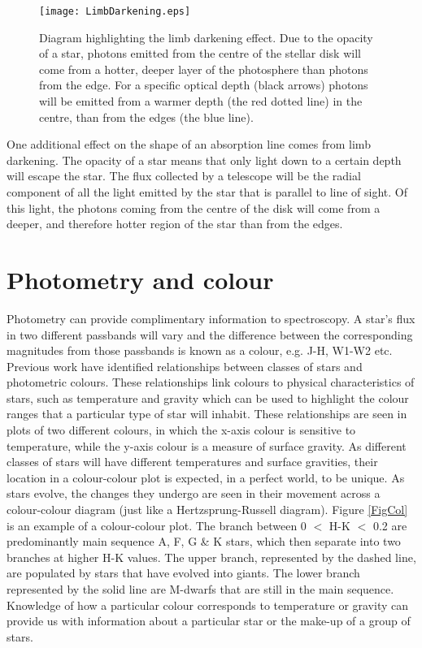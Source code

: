 \begin{figure}[!ht]
\texttt{[image: LimbDarkening.eps]}
\caption{Diagram highlighting the limb darkening effect. Due to the opacity of a star, photons emitted from the centre of the stellar disk will come from a hotter, deeper layer of the photosphere than photons from the edge. For a specific optical depth (black arrows) photons will be emitted from a warmer depth (the red dotted line) in the centre, than from the edges (the blue line).}
\label{FigLimb}
\end{figure}

One additional effect on the shape of an absorption line comes from limb darkening. The opacity of a star means that only light down to a certain depth will escape the star. The flux collected by a telescope will be the radial component of all the light emitted by the star that is parallel to line of sight. Of this light, the photons coming from the centre of the disk will come from a deeper, and therefore hotter region of the star than from the edges.\\

\section{Photometry and colour}
\label{SecPhotCol}
Photometry can provide complimentary information to spectroscopy. A star's flux in two different passbands will vary and the difference between the corresponding magnitudes from those passbands is known as a colour, e.g. J-H, W1-W2 etc. Previous work have identified relationships between classes of stars and photometric colours. These relationships link colours to physical characteristics of stars, such as temperature and gravity which can be used to highlight the colour ranges that a particular type of star will inhabit. These relationships are seen in plots of two different colours, in which the x-axis colour is sensitive to temperature, while the y-axis colour is a measure of surface gravity. As different classes of stars will have different temperatures and surface gravities, their location in a colour-colour plot is expected, in a perfect world, to be unique. As stars evolve, the changes they undergo are seen in their movement across a colour-colour diagram (just like a Hertzsprung-Russell diagram). Figure \ref{FigCol} is an example of a colour-colour plot. The branch between 0 $<$ H-K $<$ 0.2 are predominantly main sequence A, F, G \& K stars, which then separate into two branches at higher H-K values. The upper branch, represented by the dashed line, are populated by stars that have evolved into giants. The lower branch represented by the solid line are M-dwarfs that are still in the main sequence. Knowledge of how a particular colour corresponds to temperature or gravity can provide us with information about a particular star or the make-up of a group of stars.\\

